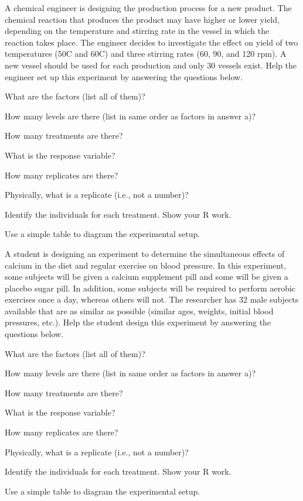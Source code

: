 \documentclass[10pt,openany]{book}\usepackage[]{graphicx}\usepackage[]{color}
\begin{document}
\begin{exsection}
  \item \label{revex:ExpDChemRxn} A chemical engineer is designing the production process for a new product. The chemical reaction that produces the product may have higher or lower yield, depending on the temperature and stirring rate in the vessel in which the reaction takes place. The engineer decides to investigate the effect on yield of two temperatures (50C and 60C) and three stirring rates (60, 90, and 120 rpm). A new vessel should be used for each production and only 30 vessels exist. Help the engineer set up this experiment by answering the questions below. 
\begin{Enumerate}
  \item What are the factors (list all of them)?
  \item How many levels are there (list in same order as factors in answer a)?
  \item How many treatments are there?
  \item What is the response variable?
  \item How many replicates are there?
  \item Physically, what is a replicate (i.e., not a number)?
  \item \rhw{} Identify the individuals for each treatment.  Show your R work.
  \item Use a simple table to diagram the experimental setup.
\end{Enumerate}

  \item \label{revex:ExpDBP} A student is designing an experiment to determine the simultaneous effects of calcium in the diet and regular exercise on blood pressure. In this experiment, some subjects will be given a calcium supplement pill and some will be given a placebo sugar pill. In addition, some subjects will be required to perform aerobic exercises once a day, whereas others will not. The researcher has 32 male subjects available that are as similar as possible (similar ages, weights, initial blood pressures, etc.).  Help the student design this experiment by answering the questions below.  
\begin{Enumerate}
  \item What are the factors (list all of them)?
  \item How many levels are there (list in same order as factors in answer a)?
  \item How many treatments are there?
  \item What is the response variable?
  \item How many replicates are there?
  \item Physically, what is a replicate (i.e., not a number)?
  \item \rhw{} Identify the individuals for each treatment.  Show your R work.
  \item Use a simple table to diagram the experimental setup.
\end{Enumerate}

\end{exsection}
\end{document}
